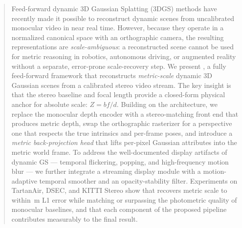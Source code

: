 \begin{abstract}
Feed-forward dynamic 3D Gaussian Splatting (3DGS) methods have recently
made it possible to reconstruct dynamic scenes from uncalibrated monocular
video in near real time. However, because they operate in a normalized
canonical space with an orthographic camera, the resulting
representations are \emph{scale-ambiguous}: a reconstructed scene cannot be
used for metric reasoning in robotics, autonomous driving, or augmented
reality without a separate, error-prone scale-recovery step. We present
\StereoSplat, a fully feed-forward framework that reconstructs
\emph{metric-scale} dynamic 3D Gaussian scenes from a calibrated stereo
video stream. The key insight is that the stereo baseline and focal length
provide a closed-form physical anchor for absolute scale:
$Z = b f / d$. Building on the \StreamSplat architecture, we replace the
monocular depth encoder with a stereo-matching front end that produces
metric depth, swap the orthographic rasterizer for a perspective one that
respects the true intrinsics and per-frame poses, and introduce a
\emph{metric back-projection head} that lifts per-pixel Gaussian
attributes into the metric world frame. To address the well-documented
display artifacts of dynamic GS --- temporal flickering, popping, and
high-frequency motion blur --- we further integrate a streaming display
module with a motion-adaptive temporal smoother and an opacity-stability
filter. Experiments on TartanAir, DSEC, and KITTI Stereo show that
\StereoSplat recovers metric scale to within \,m L1 error while
matching or surpassing the photometric quality of monocular baselines, and
that each component of the proposed pipeline contributes measurably to the
final result.
\end{abstract}
